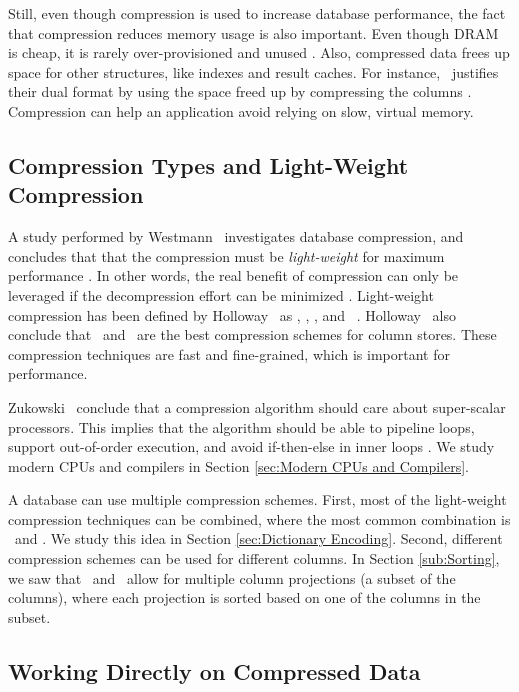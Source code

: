 Still, even though compression is used to increase database performance, the fact that compression reduces memory usage is also important. Even though DRAM is cheap, it is rarely over-provisioned and unused \cite{Barber2014-ey}. Also, compressed data frees up space for other structures, like indexes and result caches. For instance, \oracle~justifies their dual format by using the space freed up by compressing the columns \cite{Lahiri2015-mz, Lamb2012-kg}. Compression can help an application avoid relying on slow, virtual memory.

\subsection{Compression Types and Light-Weight Compression}
\label{sub:Compression Types and Light-Weight Compression}
A study performed by Westmann \ea~investigates database compression, and concludes that that the compression must be \textit{light-weight} for maximum performance \cite{Westmann2000-mz}. In other words, the real benefit of compression can only be leveraged if the decompression effort can be minimized \cite{Lemke2010-is}. Light-weight compression has been defined by Holloway \ea~as \bp, \de, \dele, and \rle~\cite{Holloway2008-rr}. Holloway \ea~also conclude that \de~and \rle~are the best compression schemes for column stores. These compression techniques are fast and fine-grained, which is important for performance.

Zukowski \ea~conclude that a compression algorithm should care about super-scalar processors. This implies that the algorithm should be able to pipeline loops, support out-of-order execution, and avoid if-then-else in inner loops \cite{Zukowski2006-oz}. We study modern CPUs and compilers in Section \ref{sec:Modern CPUs and Compilers}.

A database can use multiple compression schemes. First, most of the light-weight compression techniques can be combined, where the most common combination is \de~and \bp. We study this idea in Section \ref{sec:Dictionary Encoding}. Second, different compression schemes can be used for different columns. In Section \ref{sub:Sorting}, we saw that \cstore~and \vertica~allow for multiple column projections (a subset of the columns), where each projection is sorted based on one of the columns in the subset. 

\subsection{Working Directly on Compressed Data}
\label{sub:Working Directly on Compressed Data}

